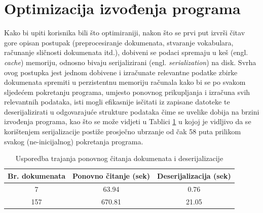 \documentclass[times, utf8, zavrsni]{fer}
\begin{document}
\section{Optimizacija izvođenja programa}
Kako bi upiti korisnika bili što optimiraniji, nakon što se prvi put izvrši čitav gore opisan postupak (preprocesiranje dokumenata, stvaranje vokabulara, računanje sličnosti dokumenata itd.), dobiveni se podaci spremaju u keš (engl. \textit{cache}) memoriju, odnosno bivaju serijalizirani (engl. \textit{serialization}) na disk. Svrha ovog postupka jest jednom dobivene i izračunate relevantne podatke zbirke dokumenata spremiti u perzistentnu memoriju računala kako bi se po svakom sljedećem pokretanju programa, umjesto ponovnog prikupljanja i izračuna svih relevantnih podataka, isti mogli efikasnije isčitati iz zapisane datoteke te deserijalizirati u odgovarajuće strukture podataka čime se uvelike dobija na brzini izvođenja programa, kao što se može vidjeti u Tablici
\ref{table:serialization} u kojoj je vidljivo da se korištenjem serijalizacije postiže prosječno ubrzanje od čak 58 puta prilikom svakog (ne-inicijalnog) pokretanja programa.

\begin{table}
\begin{center}
\begin{tabular}{|c|c|c|}
\hline
Br. dokumenata & Ponovno čitanje (sek) & Deserijalizacija (sek) \\
\hline
7 & 63.94 & 0.76 \\
157 & 670.81 & 21.05 \\
\hline
\end{tabular}
\end{center}
\caption{Usporedba trajanja ponovnog čitanja dokumenata i deserijalizacije}
\label{table:serialization}
\end{table}
\end{document}
